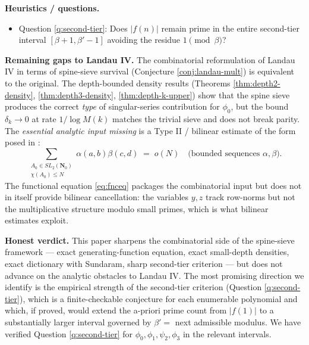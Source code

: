 \documentclass[11pt]{article}
\theoremstyle{definition}
\newcommand{\Nz}{\mathbf{N}_0}
\newcommand{\SLNz}{SL_2(\Nz)}
\begin{document}
\textbf{Heuristics / questions.}
\begin{itemize}
\item Question \ref{q:second-tier}: Does $|f(n)|$ remain prime in the entire second-tier interval $[\beta+1, \beta'-1]$ avoiding the residue $1 \pmod \beta$?
\end{itemize}

\textbf{Remaining gaps to Landau IV.} The combinatorial reformulation of Landau IV in terms of spine-sieve survival (Conjecture \ref{conj:landau-mult}) is equivalent to the original. The depth-bounded density results (Theorems \ref{thm:depth2-density}, \ref{thm:depth3-density}, \ref{thm:depth-k-upper}) show that the spine sieve produces the correct \emph{type} of singular-series contribution for $\phi_0$, but the bound $\delta_k \to 0$ at rate $1/\log M(k)$ matches the trivial sieve and does not break parity. The \emph{essential analytic input missing} is a Type II / bilinear estimate of the form posed in \cite[Question 4.1]{B8}:
\[
\sum_{\substack{A_0 \in \SLNz \\ \chi(A_0) \le N}} \alpha(a,b) \beta(c,d) \;=\; o(N) \quad \text{(bounded sequences $\alpha, \beta$)}.
\]
The functional equation \eqref{eq:fnceq} packages the combinatorial input but does not in itself provide bilinear cancellation: the variables $y, z$ track row-norms but not the multiplicative structure modulo small primes, which is what bilinear estimates exploit.

\textbf{Honest verdict.} This paper sharpens the combinatorial side of the spine-sieve framework — exact generating-function equation, exact small-depth densities, exact dictionary with Sundaram, sharp second-tier criterion — but does not advance on the analytic obstacles to Landau IV. The most promising direction we identify is the empirical strength of the second-tier criterion (Question \ref{q:second-tier}), which is a finite-checkable conjecture for each enumerable polynomial and which, if proved, would extend the a-priori prime count from $|f(1)|$ to a substantially larger interval governed by $\beta' = $ next admissible modulus. We have verified Question \ref{q:second-tier} for $\phi_0, \phi_1, \psi_2, \phi_3$ in the relevant intervals.
\end{document}

